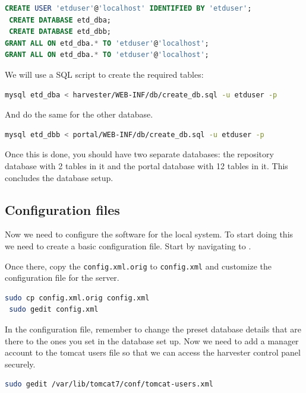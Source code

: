\documentclass[a4paper,11pt]{article}
\begin{document}
\begin{lstlisting}[language=SQL]
 CREATE USER 'etduser'@'localhost' IDENTIFIED BY 'etduser'; 
 CREATE DATABASE etd_dba; 
 CREATE DATABASE etd_dbb; 
GRANT ALL ON etd_dba.* TO 'etduser'@'localhost';
GRANT ALL ON etd_dba.* TO 'etduser'@'localhost';
\end{lstlisting}

We will use a SQL script to create the required tables: 

\begin{lstlisting}[language=bash]
 mysql etd_dba < harvester/WEB-INF/db/create_db.sql -u etduser -p
\end{lstlisting}

And do the same for the other database. 

\begin{lstlisting}[language=bash]
 mysql etd_dbb < portal/WEB-INF/db/create_db.sql -u etduser -p
\end{lstlisting}

Once this is done, you should have two separate databases: the repository database with 2 tables in it and the portal database with 12 tables in it. This concludes the database setup.

\subsection{Configuration files}

Now we need to configure the software for the local system. To start doing this we need to create a basic configuration file. Start by navigating to .

Once there, copy the \texttt{config.xml.orig} to \texttt{config.xml} and customize the configuration file for the server. 

\begin{lstlisting}[language=bash]
 sudo cp config.xml.orig config.xml 
 sudo gedit config.xml
\end{lstlisting}

In the configuration file, remember to change the preset database details that are there to the ones you set in the database set up. Now we need to add a manager account to the tomcat users file so that we can access the harvester control panel securely. 

\begin{lstlisting}[language=bash]
 sudo gedit /var/lib/tomcat7/conf/tomcat-users.xml
\end{lstlisting}
\end{document}
